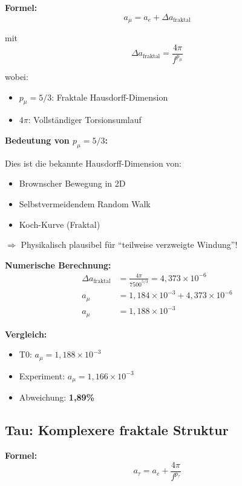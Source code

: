 	\textbf{Formel:}
	\begin{equation}
		a_\mu = a_e + \Delta a_{\text{fraktal}}
		\label{eq:amu}
	\end{equation}
	
	mit
	\begin{equation}
		\Delta a_{\text{fraktal}} = \frac{4\pi}{f^{p_\mu}}
		\label{eq:delta_mu}
	\end{equation}
	
	wobei:
	\begin{itemize}
		\item $p_\mu = 5/3$: Fraktale Hausdorff-Dimension
		\item $4\pi$: Vollständiger Torsionsumlauf
	\end{itemize}
	
	\textbf{Bedeutung von $p_\mu = 5/3$:}
	
	Dies ist die bekannte Hausdorff-Dimension von:
	\begin{itemize}
		\item Brownscher Bewegung in 2D
		\item Selbstvermeidendem Random Walk
		\item Koch-Kurve (Fraktal)
	\end{itemize}
	
	$\Rightarrow$ Physikalisch plausibel für ``teilweise verzweigte Windung''!
	
	\textbf{Numerische Berechnung:}
	\begin{align}
		\Delta a_{\text{fraktal}} &= \frac{4\pi}{7500^{5/3}} = 4{,}373 \times 10^{-6} \\
		a_\mu &= 1{,}184 \times 10^{-3} + 4{,}373 \times 10^{-6} \\
		a_\mu &= 1{,}188 \times 10^{-3}
	\end{align}
	
	\textbf{Vergleich:}
	\begin{itemize}
		\item T0: $a_\mu = 1{,}188 \times 10^{-3}$
		\item Experiment: $a_\mu = 1{,}166 \times 10^{-3}$
		\item Abweichung: \textbf{1{,}89\%}
	\end{itemize}
	
	\subsection{Tau: Komplexere fraktale Struktur}
	
	\textbf{Formel:}
	\begin{equation}
		a_\tau = a_e + \frac{4\pi}{f^{p_\tau}}
		\label{eq:atau}
	\end{equation}
	
